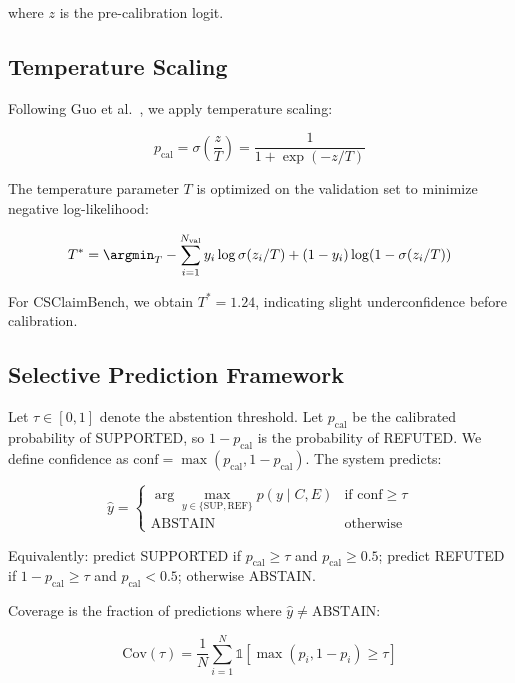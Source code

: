 \documentclass[journal]{IEEEtran}
\begin{document}
where $z$ is the pre-calibration logit.

\subsection{Temperature Scaling}

Following Guo et al.~\cite{Guo2017}, we apply temperature scaling:

\begin{equation}
p_{\text{cal}} = \sigma\left(\frac{z}{T}\right) = \frac{1}{1 + \exp(-z/T)}
\end{equation}

The temperature parameter $T$ is optimized on the validation set to minimize negative log-likelihood:

\begin{equation}
T^* = \argmin_T -\sum_{i=1}^{N_{\text{val}}} y_i \log \sigma(z_i / T) + (1-y_i) \log(1 - \sigma(z_i / T))
\end{equation}

For CSClaimBench, we obtain $T^* = 1.24$, indicating slight underconfidence before calibration.

\subsection{Selective Prediction Framework}

Let $\tau \in [0, 1]$ denote the abstention threshold. Let $p_{\text{cal}}$ be the calibrated probability of SUPPORTED, so $1 - p_{\text{cal}}$ is the probability of REFUTED. We define confidence as $\text{conf} = \max(p_{\text{cal}}, 1 - p_{\text{cal}})$. The system predicts:

\begin{equation}
\hat{y} = \begin{cases}
\arg\max_{y \in \{\text{SUP}, \text{REF}\}} p(y \mid C, E) & \text{if } \text{conf} \geq \tau \\
\text{ABSTAIN} & \text{otherwise}
\end{cases}
\end{equation}

Equivalently: predict SUPPORTED if $p_{\text{cal}} \geq \tau$ and $p_{\text{cal}} \geq 0.5$; predict REFUTED if $1 - p_{\text{cal}} \geq \tau$ and $p_{\text{cal}} < 0.5$; otherwise ABSTAIN.

Coverage is the fraction of predictions where $\hat{y} \neq \text{ABSTAIN}$:

\begin{equation}
\text{Cov}(\tau) = \frac{1}{N} \sum_{i=1}^{N} \mathbb{1}[\max(p_i, 1-p_i) \geq \tau]
\end{equation}
\end{document}
